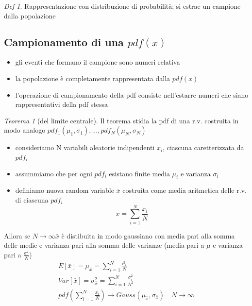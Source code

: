 \documentclass[12pt]{report}
\theoremstyle{remark}
\theoremstyle{theorem}
\newtheorem*{teo}{Teorema}
\newtheorem*{Def}{Def}
\begin{document}
\begin{Def}
	Rappresentazione con distribuzione di probabilità; si estrae un campione dalla popolazione	
\end{Def}

\subsection*{Campionamento di una $pdf(x)$}
\begin{itemize}
	\item gli eventi che formano il campione sono numeri relativa
	\item la popolazione è completamente rappresentata dalla $pdf(x)$
	\item l'operazione di campionamento della pdf consiste nell'estarre numeri che siano rappresentativi della pdf stessa
\end{itemize}

\begin{teo}[del limite centrale]
	Il teorema stidia la pdf di una r.v. costruita in modo analogo $pdf_1(\mu_1,\sigma_1),\dots, pdf_N(\mu_N,\sigma_N)$ 
	\begin{itemize}
		\item consideriamo N variabili aleatorie indipendenti $x_i$, ciascuna caretterizzata da $pdf_i$
		\item assummiamo che per ogni $pdf_i$ esistano finite media $\mu_i$ e varianza $\sigma_i$
		\item definiamo nuova random variable $\bar{x}$ costruita come media aritmetica delle r.v. di ciascuna $pdf_i$
		\[\bar{x} = \sum_{i=1}^N \frac{x_i}{N}\]
		\end{itemize}
	Allora se $N\to\infty$$\bar{x}$ è distibuita in modo gaussiano con media pari alla somma delle medie e varianza pari alla somma delle varianze (media pari a $\mu$ e varianza pari a $\frac{\sigma^2}{N}$)
	\begin{gather*}
		E[\bar{x}] = \mu_{\bar{x}} = \sum_{i=1}^N \frac{\mu_i}{N}\\
		Var[\bar{x}] = \sigma^2_{\bar{x}} = \sum_{i=1}^N \frac{\sigma^2_i}{N^2}\\
		pdf \left(\sum_{i=1}^N \frac{x_i}{N}\right) \to Gauss(\mu_{\bar{x}},\sigma_{\bar{x}}) \quad N\to\infty
	\end{gather*}
\end{teo}
\end{document}
